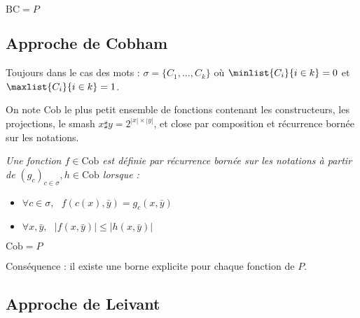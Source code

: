 \documentclass{report}
\begin{document}
		
		\begin{theorem}\cite{BellantoniCook1992}
			\label{thm:BC_equals_P}
			$\text{BC} = P$
		\end{theorem}
		
		
		\subsection{Approche de Cobham}
		\label{sec:Cobham}
			
		Toujours dans le cas des mots : $\sigma = \{ C_1, \dots, C_k \}$ où $\minlist{C_i}{i \in k} = 0$ et $\maxlist{C_i}{i \in k} = 1$.
		
		
		\begin{definition}
			\label{def:Cob}
			On note $\text{Cob}$ le plus petit ensemble de fonctions contenant les constructeurs, les projections, le smash $x \sharp y = 2^{\left| x \right| \times \left| y\right|}$, et close par composition et récurrence bornée sur les notations.
			
			
			\emph{Une fonction $f \in \text{Cob}$ est définie par récurrence bornée sur les notations à partir de $(g_c)_{c \in \sigma}, h \in \text{Cob}$ lorsque :}
			
			\begin{itemize}[itemsep=-1mm]
				\item 	$\forall c \in \sigma, \:\:\: f\left( c(x), \bar{y} \right) = g_c\left( x, \bar{y} \right)$
				\item 	$\forall x, \bar{y}, \:\:\: \left| f \left( x, \bar{y} \right) \right| \leq \left| h \left( x, \bar{y} \right) \right|$
			\end{itemize}
			
		\end{definition}
		
		
		\begin{theorem}[Cobham]
			\label{thm:Cob_equals_P}
			$\text{Cob} = P$
		\end{theorem}
			
		Conséquence : il existe une borne explicite pour chaque fonction de $P$. 
		
		
		
		\subsection{Approche de Leivant}
		\label{subsec:Leivant}
	
		
\end{document}
